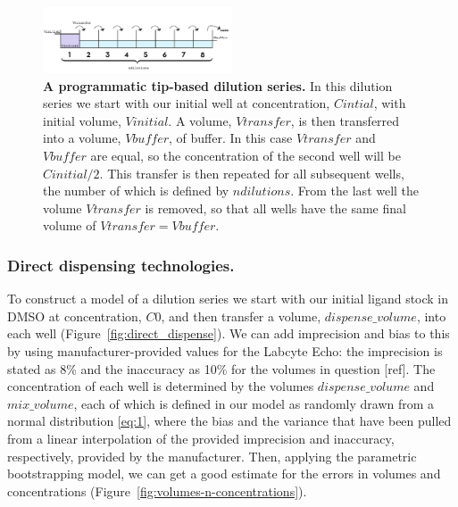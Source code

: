 \documentclass[aps,pre,twocolumn,nofootinbib,superscriptaddress,linenumbers]{revtex4-1}
\begin{document}
\begin{figure}[tb]
    \includegraphics[width=0.5\textwidth]{../figures/dilution.pdf}

  \caption{{\bf A programmatic tip-based dilution series.}
  In this dilution series we start with our initial well at concentration, $Cintial$, with initial volume, $Vinitial$. A volume, $Vtransfer$, is then transferred into a volume, $Vbuffer$, of buffer. 
  In this case $Vtransfer$ and $Vbuffer$ are equal, so the concentration of the second well will be $Cinitial/2$. This transfer is then repeated for all subsequent wells, the number of which is defined by $ndilutions$. 
  From the last well the volume $Vtransfer$ is removed, so that all wells have the same final volume of $Vtransfer=Vbuffer$.
  }
  \label{fig:dilution}
\end{figure}

\subsubsection*{Direct dispensing technologies.}

To construct a model of a dilution series we start with our initial ligand stock in DMSO at concentration, $C0$, and then transfer a volume, $dispense\_volume$, into each well (Figure~\ref{fig:direct_dispense}). 
We can add imprecision and bias to this by using manufacturer-provided values for the Labcyte Echo: the imprecision is stated as 8\% and the inaccuracy as 10\% for the volumes in question [ref]. 
The concentration of each well is determined by the volumes $dispense\_volume$ and $mix\_volume$, each of which is defined in our model as randomly drawn from a normal distribution \ref{eq:1}, where the bias and the variance that have been pulled from a linear interpolation of the provided imprecision and inaccuracy, respectively, provided by the manufacturer.
Then, applying the parametric bootstrapping model, we can get a good estimate for the errors in volumes and concentrations (Figure~\ref{fig:volumes-n-concentrations}).
\end{document}
